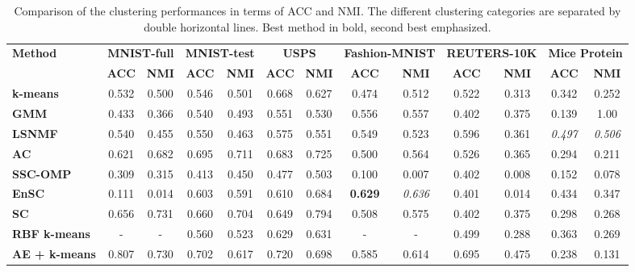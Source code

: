 \documentclass{article}
\begin{document}
\begin{table}
  \caption{Comparison of the clustering performances in terms of ACC and NMI. The different clustering categories are separated by double horizontal lines. Best method in bold, second best emphasized.}
  \vskip 0.15in
  \begin{center}
  \begin{small}
  \begin{tabular}{|p{2.45cm}|c|c|c|c|c|c|c|c|c|c|c|c|}
    \hline
    {\textbf{Method}} & \multicolumn{2}{c|}{\textbf{MNIST-full}} & \multicolumn{2}{c|}{\textbf{MNIST-test}} & \multicolumn{2}{c|}{\textbf{USPS}} & \multicolumn{2}{c|}{\textbf{Fashion-MNIST}} & \multicolumn{2}{c|}{\textbf{REUTERS-10K}}& \multicolumn{2}{c|}{\textbf{Mice Protein}}\\
\cline{2-13}
    & \textbf{ACC} & \textbf{NMI} & \textbf{ACC} & \textbf{NMI} & \textbf{ACC} & \textbf{NMI} & \textbf{ACC} & \textbf{NMI} & \textbf{ACC} & \textbf{NMI} & \textbf{ACC} & \textbf{NMI} \\ \hline
    \textbf{k-means} & 0.532 & 0.500 & 0.546 & 0.501 & 0.668 & 0.627 & 0.474 & 0.512 & 0.522 & 0.313 & 0.342 & 0.252 \\ \hline
    \textbf{GMM} & 0.433 & 0.366 & 0.540 & 0.493 & 0.551 & 0.530 & 0.556 & 0.557 & 0.402 & 0.375 &  0.139 & 1.00 \\ \hline
    \textbf{LSNMF} & 0.540 & 0.455 & 0.550 & 0.463  & 0.575 & 0.551 & 0.549 & 0.523 & 0.596 & 0.361 &  \textit{0.497} & \textit{0.506} \\ \hline 
    \textbf{AC} & 0.621 & 0.682 & 0.695 & 0.711 & 0.683 & 0.725 & 0.500 & 0.564 & 0.526 & 0.365 &  0.294 & 0.211 \\ \hline \hline
    \textbf{SSC-OMP} & 0.309 & 0.315 & 0.413 & 0.450 & 0.477 & 0.503 & 0.100 & 0.007 & 0.402 & 0.008 & 0.152 & 0.078 \\ \hline
    \textbf{EnSC} & 0.111 & 0.014 & 0.603 & 0.591 & 0.610 & 0.684 & \textbf{0.629} & \textit{0.636} & 0.401 & 0.014 & 0.434 & 0.347 \\ \hline \hline
    \textbf{SC} & 0.656 & 0.731 & 0.660 & 0.704 & 0.649 & 0.794 & 0.508 & 0.575 & 0.402 & 0.375 &  0.298 & 0.268 \\ \hline
    \textbf{RBF k-means} & {-} & {-} & 0.560 & 0.523 & 0.629 & 0.631 & {-} & {-} & 0.499 & 0.288 &  0.363 & 0.269 \\ \hline \hline
    \textbf{AE + k-means} & 0.807 & 0.730 & 0.702 & 0.617 & 0.720 & 0.698 & 0.585 & 0.614 & 0.695 & 0.475 & 0.238  & 0.131\\ \hline

\end{tabular}
\end{small}
\end{center}
\end{table}
\end{document}
